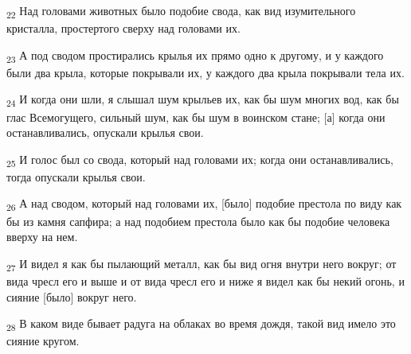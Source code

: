 \begin{tcolorbox}
\textsubscript{22} Над головами животных было подобие свода, как вид изумительного кристалла, простертого сверху над головами их.
\end{tcolorbox}
\begin{tcolorbox}
\textsubscript{23} А под сводом простирались крылья их прямо одно к другому, и у каждого были два крыла, которые покрывали их, у каждого два крыла покрывали тела их.
\end{tcolorbox}
\begin{tcolorbox}
\textsubscript{24} И когда они шли, я слышал шум крыльев их, как бы шум многих вод, как бы глас Всемогущего, сильный шум, как бы шум в воинском стане; [а] когда они останавливались, опускали крылья свои.
\end{tcolorbox}
\begin{tcolorbox}
\textsubscript{25} И голос был со свода, который над головами их; когда они останавливались, тогда опускали крылья свои.
\end{tcolorbox}
\begin{tcolorbox}
\textsubscript{26} А над сводом, который над головами их, [было] подобие престола по виду как бы из камня сапфира; а над подобием престола было как бы подобие человека вверху на нем.
\end{tcolorbox}
\begin{tcolorbox}
\textsubscript{27} И видел я как бы пылающий металл, как бы вид огня внутри него вокруг; от вида чресл его и выше и от вида чресл его и ниже я видел как бы некий огонь, и сияние [было] вокруг него.
\end{tcolorbox}
\begin{tcolorbox}
\textsubscript{28} В каком виде бывает радуга на облаках во время дождя, такой вид имело это сияние кругом.
\end{tcolorbox}
